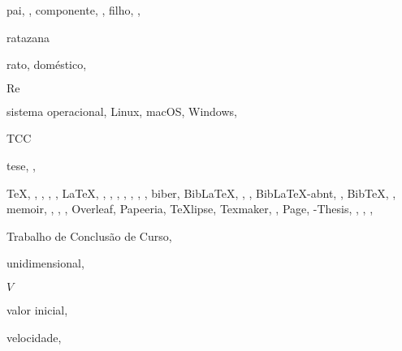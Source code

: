 \begin{RemissiveIndex}
\indexspace%
\item pai, , 
\subitem componente, , 
\subitem filho, , 
\indexspace%
\item ratazana 
\item rato, 
\subitem doméstico, 
\item \ensuremath{\mathrm{Re}} 
\indexspace%
\item sistema operacional, 
\subitem Linux, 
\subitem macOS, 
\subitem Windows, 
\indexspace%
\item TCC 
\item tese, , 
\item \TeX, , , , , 
\subitem \LaTeX, , , , , , , , 
\subsubitem biber, 
\subsubitem Bib\LaTeX, , , 
\subsubitem Bib\LaTeX-abnt, , 
\subsubitem Bib\TeX, , 
\subsubitem memoir, , , , 
\subsubitem Overleaf, 
\subsubitem Papeeria, 
\subsubitem TeXlipse, 
\subsubitem Texmaker, , 
\subsubitem {\TeX}Page, 
\subsubitem \UTFPR-Thesis, , , , 
\item Trabalho de Conclusão de Curso, 
\indexspace%
\item unidimensional, 
\indexspace%
\item \ensuremath{V} 
\item valor inicial, 
\item velocidade, 
\end{RemissiveIndex}
